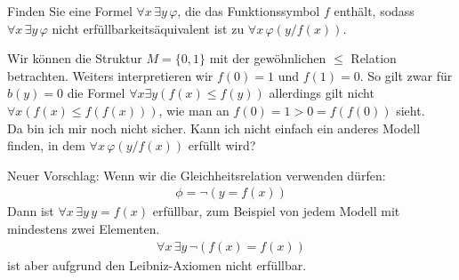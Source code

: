 
\begin{exercise}[176]
Finden Sie eine Formel $\forall x\, \exists y\, \varphi$, die das Funktionssymbol $f$
enthält, sodass $\forall x\, \exists y\, \varphi$ nicht erfüllbarkeitsäquivalent ist zu
$\forall x\, \varphi(y/f(x))$.
\end{exercise}


\begin{solution}
	Wir können die Struktur $M = \{0, 1\}$ mit der gewöhnlichen $\leq$ Relation betrachten.
  Weiters interpretieren wir $f(0) = 1$ und $f(1) = 0$.
  So gilt zwar für $b(y) = 0$ die Formel $\forall x \exists y (f(x) \leq f(y))$
  allerdings gilt nicht $\forall x (f(x) \leq f(f(x)))$,
  wie man an $f(0) = 1 > 0 = f(f(0))$ sieht. \\


  Da bin ich mir noch nicht sicher. Kann ich nicht einfach ein anderes Modell
  finden, in dem $\forall x\, \varphi(y/f(x))$ erfüllt wird?
\end{solution}



\begin{solution}
	Neuer Vorschlag: Wenn wir die Gleichheitsrelation verwenden dürfen:
	\begin{align*}
		\phi = \neg(y = f(x))
	\end{align*}
	Dann ist $\forall x\, \exists y\, y = f(x)$ erfüllbar, zum Beispiel von jedem
	Modell mit mindestens zwei Elementen.
	\begin{align*}
		\forall x\, \exists y\, \neg(f(x) = f(x))
	\end{align*}
	ist aber aufgrund den Leibniz-Axiomen nicht erfüllbar.
\end{solution}

